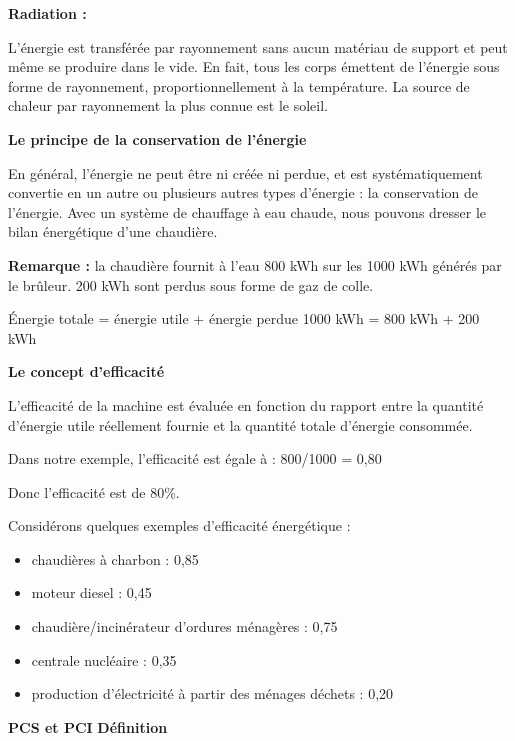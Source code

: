 \vspace{0.3cm}
\textbf{Radiation :} 
\vspace{0.3cm}

L'énergie est transférée par rayonnement sans aucun matériau de support et peut même se produire dans le vide. 
En fait, tous les corps émettent de l'énergie sous forme de rayonnement, proportionnellement à la température.
La source de chaleur par rayonnement la plus connue est le soleil.

\vspace{0.3cm}
\textbf{Le principe de la conservation de l'énergie }
\vspace{0.3cm}


En général, l'énergie ne peut être ni créée ni perdue, et est systématiquement convertie en un autre ou plusieurs autres types d'énergie : la conservation de l'énergie. Avec un système de chauffage à eau chaude, nous pouvons dresser le bilan énergétique d'une chaudière.

\vspace{0.3cm}
\textbf{Remarque :} la chaudière fournit à l'eau 800 kWh sur les 1000 kWh générés par le brûleur. 
200 kWh sont perdus sous forme de gaz de colle.
\vspace{0.3cm}

Énergie totale = énergie utile + énergie perdue
1000 kWh = 800 kWh + 200 kWh

\vspace{0.3cm}
\textbf{Le concept d'efficacité}
\vspace{0.3cm}

L'efficacité de la machine est évaluée en fonction du rapport entre la quantité d'énergie utile réellement fournie et la quantité totale d'énergie consommée.
	
	Dans notre exemple, l'efficacité est égale à :
	800/1000 = 0,80

Donc l'efficacité est de 80\%.

Considérons quelques exemples d'efficacité énergétique :
\begin{itemize}
    \item chaudières à charbon : 0,85
    \item moteur diesel : 0,45
    \item chaudière/incinérateur d'ordures ménagères : 0,75
    \item centrale nucléaire : 0,35
    \item production d'électricité à partir des ménages déchets : 0,20
\end{itemize}
\vspace{0.3cm}
\textbf{PCS et PCI} 
\vspace{0.3cm}
\textbf{Définition}
\vspace{0.3cm}

